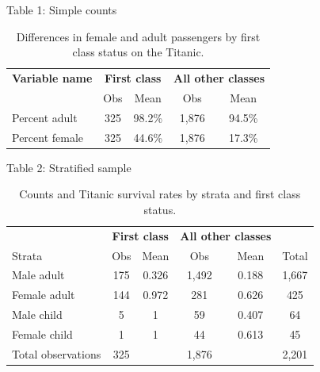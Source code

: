 \documentclass{beamer}
\begin{document}
\begin{frame}{Table 1: Simple counts}

{\renewcommand{\arraystretch}{1.1}
\tabcolsep 		
\begin{table}\small{}
\caption{Differences in female and adult passengers by first class status on the Titanic. }
\centering
\begin{tabular}{lcc|cc}
\toprule
\multicolumn{1}{c}{\textbf{Variable name}}&
\multicolumn{2}{c}{\textbf{First class}}&
\multicolumn{2}{c}{\textbf{All other classes}}\\
\multicolumn{1}{c}{}&
\multicolumn{1}{c}{Obs}&
\multicolumn{1}{c}{Mean}&
\multicolumn{1}{c}{Obs}&
\multicolumn{1}{c}{Mean}\\
\midrule
Percent adult		&	325 	& 98.2\% & 1,876 & 94.5\% \\
Percent female		& 	325	& 44.6\% & 1,876 & 17.3\% \\
\bottomrule
\end{tabular}
\label{tab:titanic-age}
\end{table}}
\end{frame}


\begin{frame}{Table 2: Stratified sample}

{\renewcommand{\arraystretch}{1.1}
\tabcolsep 		
\begin{table}\small{}
\caption{Counts and Titanic survival rates by strata and first class status.}
\centering
\begin{tabular}{lcc|cc|c}
\toprule
\multicolumn{1}{c}{\textbf{}}&
\multicolumn{2}{c}{\textbf{First class}}&
\multicolumn{2}{c}{\textbf{All other classes}}&
\multicolumn{1}{c}{\textbf{}}\\
\multicolumn{1}{l}{Strata}&
\multicolumn{1}{c}{Obs}&
\multicolumn{1}{c}{Mean}&
\multicolumn{1}{c}{Obs}&
\multicolumn{1}{c}{Mean}&
\multicolumn{1}{c}{Total}\\
\midrule
Male adult		& 175	& 0.326	& 1,492	& 0.188	& 1,667 \\
Female adult	& 144	& 0.972	& 281	& 0.626	& 425 \\
Male child		& 5		& 1		& 59		& 0.407 	& 64\\
Female child	& 1		& 1		& 44		& 0.613 	& 45\\
\midrule
Total	observations	& 325	&&	1,876	 && 2,201\\
\bottomrule
\end{tabular}
\label{tab:titanic-counts}
\end{table}}


\end{frame}
\end{document}
